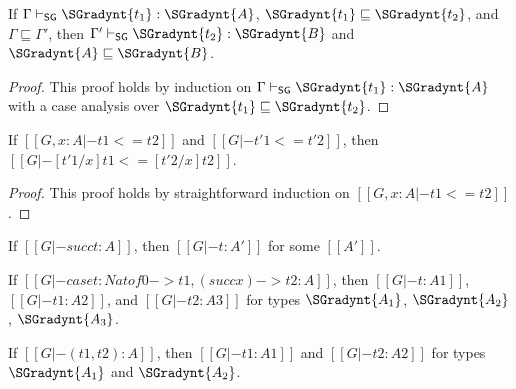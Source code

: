 \begin{lemma}
  \label{lemma:typing_for_type_precision}
  If $ \Gamma  \vdash_{\mathsf{SG} }  \SGradynt{t_{{\mathrm{1}}}}  :  \SGradynt{A} $, $ \SGradynt{t_{{\mathrm{1}}}}  \sqsubseteq  \SGradynt{t_{{\mathrm{2}}}} $, and $ \Gamma  \sqsubseteq  \Gamma' $, then $ \Gamma'  \vdash_{\mathsf{SG} }  \SGradynt{t_{{\mathrm{2}}}}  :  \SGradynt{B} $ and $ \SGradynt{A}  \sqsubseteq  \SGradynt{B} $.
\end{lemma}
\begin{proof}
  This proof holds by induction on $ \Gamma  \vdash_{\mathsf{SG} }  \SGradynt{t_{{\mathrm{1}}}}  :  \SGradynt{A} $ with a case analysis over $ \SGradynt{t_{{\mathrm{1}}}}  \sqsubseteq  \SGradynt{t_{{\mathrm{2}}}} $.
\end{proof}

\begin{lemma}
  \label{lemma:substitution_for_term_precision}
  If $[[G, x : A |- t1 <= t2]]$ and $[[G |- t'1 <= t'2]]$, then $[[G |- [t'1/x]t1 <= [t'2/x]t2]]$.
\end{lemma}
\begin{proof}
  This proof holds by straightforward induction on $[[G, x : A |- t1 <= t2]]$.
\end{proof}

\begin{lemma}
  \label{lemma:typeability_inversion}
  \begin{enumR}
  \item[] 
  \item If $[[G |- succ t : A]]$, then $[[G |- t : A']]$ for some $[[A']]$.
  \item If $[[G |- case t : Nat of 0 -> t1, (succ x) -> t2 : A]]$, then $[[G |- t : A1]]$, $[[G |- t1 : A2]]$, and $[[G |- t2 : A3]]$
    for types $\SGradynt{A_{{\mathrm{1}}}}$, $\SGradynt{A_{{\mathrm{2}}}}$, $\SGradynt{A_{{\mathrm{3}}}}$.
  \item If $[[G |- (t1, t2) : A]]$, then $[[G |- t1 : A1]]$ and  $[[G |- t2 : A2]]$ for types $\SGradynt{A_{{\mathrm{1}}}}$ and $\SGradynt{A_{{\mathrm{2}}}}$.
  \end{enumR}
\end{lemma}

